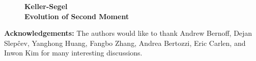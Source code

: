 \documentclass[11pt,leqno]{amsart}
\theoremstyle{definition}
\newcommand{\be}{\begin{equation}}
\newcommand{\ee}{\end{equation}}
\newcommand{\bes}{\begin{equation*}}
\newcommand{\ees}{\end{equation*}}
\newcommand{\mt}[1]{\mathrm{#1}}
\newcommand{\R}{{\mathord{\mathbb R}}}
\def\P{{\mathcal P}}
\def\e{\varepsilon}
\begin{document}
\begin{figure}[!ht]
\centering
\textbf{Keller-Segel  \\
Evolution of Second Moment}
\end{figure}


\textbf{Acknowledgements:} The authors would like to thank Andrew Bernoff, Dejan Slep\^cev, Yanghong Huang, Fangbo Zhang, Andrea Bertozzi, Eric Carlen, and Inwon Kim for many interesting discussions.

%
%
%
%
%
\end{document}
